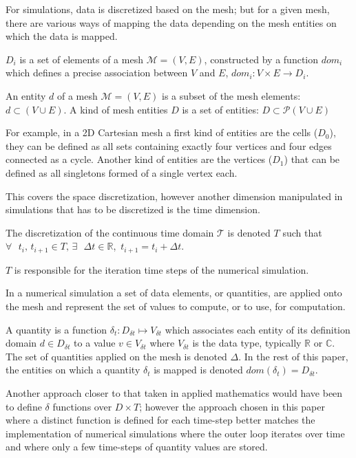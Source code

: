 For simulations, data is discretized based on the mesh; but for a given mesh, there are various ways of mapping the data depending on the mesh entities on which the data is mapped.
\begin{mydef}
$D_i$ is a set of elements of a mesh $\mathcal{M}=(V,E)$, constructed by a function $dom_i$ which defines a precise association between $V$ and $E$, $dom_i : V \times E \rightarrow D_i$.
\end{mydef}

\begin{mydef}
An entity $d$ of a mesh $\mathcal{M}=(V,E)$ is a subset of the mesh elements: $d\subset (V\cup E)$.
A kind of mesh entities $D$ is a set of entities: $D\subset \mathcal{P}(V\cup E)$
\end{mydef}
For example, in a 2D Cartesian mesh a first kind of entities are the cells ($D_0$), they can be defined as all sets containing exactly four vertices and four edges connected as a cycle. Another kind of entities are the vertices ($D_1$) that can be defined as all singletons formed of a single vertex each.

This covers the space discretization, however another dimension manipulated in simulations that has to be discretized is the time dimension.
\begin{mydef}
The discretization of the continuous time domain $\mathcal{T}$ is denoted $T$ such that $\forall\mbox{ }t_i\mbox{, }t_{i+1} \in T\mbox{, }\exists\mbox{ }\Delta t \in \mathbb{R}$\mbox{, }$t_{i+1} = t_i + \Delta t$.
\end{mydef}
$T$ is responsible for the iteration time steps of the numerical simulation. 

In a numerical simulation a set of data elements, or quantities, are applied onto the mesh and represent the set of values to compute, or to use, for computation.
\begin{mydef}
A quantity is a function $\delta_t: D_{\delta t} \mapsto V_{\delta t}$ which associates each entity of its definition domain $d\in D_{\delta t}$ to a value $v\in V_{\delta t}$ where $V_{\delta t}$ is the data type, typically $\mathbb{R}$ or $\mathbb{C}$.
The set of quantities applied on the mesh is denoted $\Delta$.
In the rest of this paper, the entities on which a quantity $\delta_t$ is mapped is denoted $dom(\delta_t)=D_{\delta t}$.
\end{mydef}
Another approach closer to that taken in applied mathematics would have been to define $\delta$ functions over $D \times T$; however the approach chosen in this paper where a distinct function is defined for each time-step better matches the implementation of numerical simulations where the outer loop iterates over time and where only a few time-steps of quantity values are stored.

